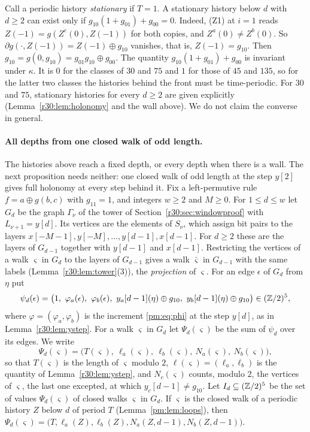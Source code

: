\begin{remark}\label{pm:rem:stationary}
Call a periodic history \emph{stationary} if $T=1$. A stationary history below $d$ with $d\ge2$ can exist only if $g_{10}(1+g_{01})+g_{00}=0$. Indeed, (Z1) at $i=1$ reads $Z(-1)=g(Z^c(0),Z(-1))$ for both copies, and $Z^a(0)\ne Z^b(0)$. So $\partial g(\cdot,Z(-1))=Z(-1)\oplus g_{10}$ vanishes, that is, $Z(-1)=g_{10}$. Then $g_{10}=g(0,g_{10})=g_{01}g_{10}\oplus g_{00}$. The quantity $g_{10}(1+g_{01})+g_{00}$ is invariant under $\kappa$. It is $0$ for the classes of $30$ and $75$ and $1$ for those of $45$ and $135$, so for the latter two classes the histories behind the front must be time-periodic. For $30$ and $75$, stationary histories for every $d\ge2$ are given explicitly (Lemma~\ref{r30:lem:holonomy} and the wall above). We do not claim the converse in general.
\end{remark}

\paragraph{All depths from one closed walk of odd length.}
The histories above reach a fixed depth, or every depth when there is a wall. The next proposition needs neither: one closed walk of odd length at the step $y[2]$ gives full holonomy at every step behind it. Fix a left-permutive rule $f=a\oplus g(b,c)$ with $g_{11}=1$, and integers $w\ge2$ and $M\ge0$. For $1\le d\le w$ let $G_d$ be the graph $\Gamma_\nu$ of the tower of Section~\ref{r30:sec:windowproof} with $L_{\nu+1}=y[d]$. Its vertices are the elements of $S_\nu$, which assign bit pairs to the layers $x[-M-1],y[-M],\dots,y[d-1],x[d-1]$. For $d\ge2$ these are the layers of $G_{d-1}$ together with $y[d-1]$ and $x[d-1]$. Restricting the vertices of a walk $\varsigma$ in $G_d$ to the layers of $G_{d-1}$ gives a walk $\bar\varsigma$ in $G_{d-1}$ with the same labels (Lemma~\ref{r30:lem:tower}(3)), the \emph{projection} of $\varsigma$. For an edge $\epsilon$ of $G_d$ from $\eta$ put
\[
\psi_d(\epsilon)=\bigl(1,\ \varphi_a(\epsilon),\ \varphi_b(\epsilon),\ y_a[d-1](\eta)\oplus g_{10},\ y_b[d-1](\eta)\oplus g_{10}\bigr)\in(\Z/2)^5,
\]
where $\varphi=(\varphi_a,\varphi_b)$ is the increment \eqref{pm:eq:phi} at the step $y[d]$, as in Lemma~\ref{r30:lem:ystep}. For a walk $\varsigma$ in $G_d$ let $\Psi_d(\varsigma)$ be the sum of $\psi_d$ over its edges. We write
\[
\Psi_d(\varsigma)=\bigl(T(\varsigma),\ \ell_a(\varsigma),\ \ell_b(\varsigma),\ N_a(\varsigma),\ N_b(\varsigma)\bigr),
\]
so that $T(\varsigma)$ is the length of $\varsigma$ modulo $2$, $\ell(\varsigma)=(\ell_a,\ell_b)$ is the quantity of Lemma~\ref{r30:lem:ystep}, and $N_c(\varsigma)$ counts, modulo $2$, the vertices of $\varsigma$, the last one excepted, at which $y_c[d-1]\ne g_{10}$. Let $I_d\subseteq(\mathbb{Z}/2)^5$ be the set of values $\Psi_d(\varsigma)$ of closed walks $\varsigma$ in $G_d$. If $\varsigma$ is the closed walk of a periodic history $Z$ below $d$ of period $T$ (Lemma~\ref{pm:lem:loops}), then $\Psi_d(\varsigma)=\bigl(T,\ell_a(Z),\ell_b(Z),N_a(Z,d-1),N_b(Z,d-1)\bigr)$.

